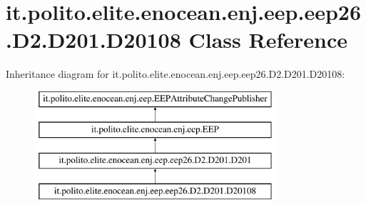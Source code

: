 \hypertarget{classit_1_1polito_1_1elite_1_1enocean_1_1enj_1_1eep_1_1eep26_1_1_d2_1_1_d201_1_1_d20108}{}\section{it.\+polito.\+elite.\+enocean.\+enj.\+eep.\+eep26.\+D2.\+D201.\+D20108 Class Reference}
\label{classit_1_1polito_1_1elite_1_1enocean_1_1enj_1_1eep_1_1eep26_1_1_d2_1_1_d201_1_1_d20108}
Inheritance diagram for it.\+polito.\+elite.\+enocean.\+enj.\+eep.\+eep26.\+D2.\+D201.\+D20108\+:\begin{figure}[H]
\begin{center}
\leavevmode
\includegraphics[height=4.000000cm]{classit_1_1polito_1_1elite_1_1enocean_1_1enj_1_1eep_1_1eep26_1_1_d2_1_1_d201_1_1_d20108}
\end{center}
\end{figure}
